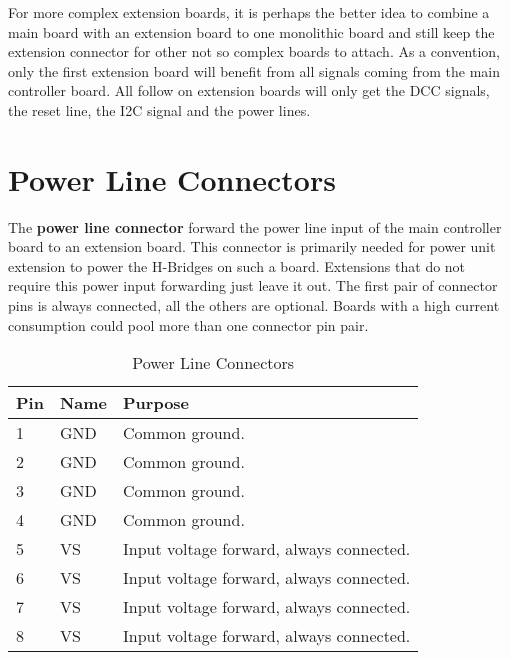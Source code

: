 For more complex extension boards, it is perhaps the better idea to combine a main board with an extension board to one monolithic board and still keep the extension connector for other not so complex boards to attach. As a convention, only the first extension board will benefit from all signals coming from the main controller board. All follow on extension boards will only get the DCC signals, the reset line, the I2C signal and the power lines.

\section{Power Line Connectors}

The \textbf{power line connector} forward the power line input of the main controller board to an extension board. This connector is primarily needed for power unit extension to power the H-Bridges on such a board. Extensions that do not require this power input forwarding just leave it out. The first pair of connector pins is always connected, all the others are optional. Boards with a high current consumption could pool more than one connector pin pair.

\begin{table}[!ht]
    \begin{center}
        \caption{Power Line Connectors}
        \begin{tabular}{|l|l|p{}|}
            \toprule
            \textbf{Pin} & \textbf{Name} & \textbf{Purpose} \\
            \midrule
            1 & GND & Common ground. \\
            \midrule
            2 & GND & Common ground. \\
            \midrule
            3 & GND & Common ground. \\
            \midrule
            4 & GND & Common ground. \\
            \midrule
            5 & VS & Input voltage forward, always connected. \\
            \midrule
            6 & VS & Input voltage forward, always connected. \\
            \midrule
            7 & VS & Input voltage forward, always connected. \\
            \midrule
            8 & VS & Input voltage forward, always connected. \\
            \bottomrule
        \end{tabular}
    \end{center}
\end{table}

